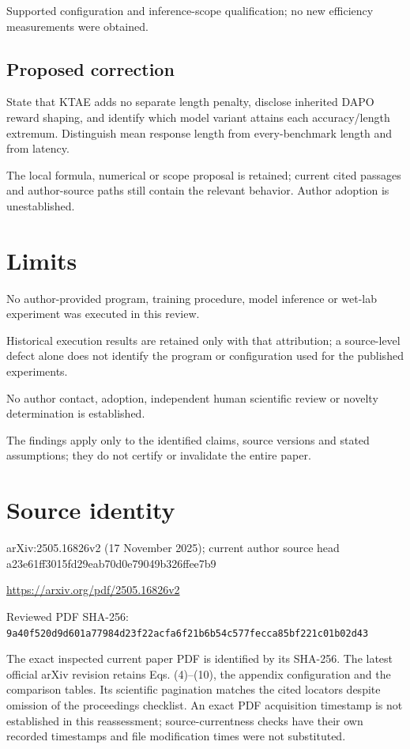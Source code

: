 \documentclass[11pt]{article}
\begin{document}
Supported configuration and inference-scope qualification; no new efficiency measurements were obtained.

\subsection*{Proposed correction}

State that KTAE adds no separate length penalty, disclose inherited DAPO reward shaping, and identify which model variant attains each accuracy/length extremum. Distinguish mean response length from every-benchmark length and from latency.

The local formula, numerical or scope proposal is retained; current cited passages and author-source paths still contain the relevant behavior. Author adoption is unestablished.

\section*{Limits}

No author-provided program, training procedure, model inference or wet-lab experiment was executed in this review.\par

Historical execution results are retained only with that attribution; a source-level defect alone does not identify the program or configuration used for the published experiments.\par

No author contact, adoption, independent human scientific review or novelty determination is established.\par

The findings apply only to the identified claims, source versions and stated assumptions; they do not certify or invalidate the entire paper.\par

\section*{Source identity}

arXiv:2505.16826v2 (17 November 2025); current author source head a23e61ff3015fd29eab70d0e79049b326ffee7b9

\url{https://arxiv.org/pdf/2505.16826v2}

Reviewed PDF SHA-256: \nolinkurl{9a40f520d9d601a77984d23f22acfa6f21b6b54c577fecca85bf221c01b02d43}

The exact inspected current paper PDF is identified by its SHA-256. The latest official arXiv revision retains Eqs. (4)–(10), the appendix configuration and the comparison tables. Its scientific pagination matches the cited locators despite omission of the proceedings checklist. An exact PDF acquisition timestamp is not established in this reassessment; source-currentness checks have their own recorded timestamps and file modification times were not substituted.
\end{document}
